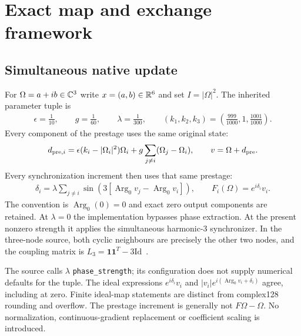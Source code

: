 \section{Exact map and exchange framework}\label{sec:model}
\subsection{Simultaneous native update}\label{sec:native}
For $\Omega=a+ib\in\mathbb C^3$ write $x=(a,b)\in\mathbb R^6$ and set $I=|\Omega|^2$. The inherited parameter tuple is~\cite[Section 6, native tuple]{rx}
\begin{equation}\label{eq:a01}%
\begin{gathered}
\epsilon=\frac1{10},\qquad g=\frac1{60},\qquad
\lambda=\frac1{300},\qquad
(k_1,k_2,k_3)=\left(\frac{999}{1000},1,\frac{1001}{1000}\right).
\end{gathered}
\end{equation}
Every component of the prestage uses the same original state:
\begin{equation}\label{eq:a02}%
\begin{gathered}
d_{{\rm pre},i}=\epsilon(k_i-|\Omega_i|^2)\Omega_i+
g\sum_{j\ne i}(\Omega_j-\Omega_i),\qquad v=\Omega+d_{\rm pre}.
\end{gathered}
\end{equation}
Every synchronization increment then uses that same prestage:
\begin{equation}\label{eq:a03}%
\begin{gathered}
\delta_i=\lambda\sum_{j\ne i}\sin(3[\operatorname{Arg}_0v_j-\operatorname{Arg}_0v_i]),
\qquad F_i(\Omega)=e^{i\delta_i}v_i.
\end{gathered}
\end{equation}
The convention is $\operatorname{Arg}_0(0)=0$ and exact zero output components are retained. At $\lambda=0$ the implementation bypasses phase extraction. At the present nonzero strength it applies the simultaneous harmonic-3 synchronizer. In the three-node source, both cyclic neighbours are precisely the other two nodes, and the coupling matrix is $L_3=\mathbf1\mathbf1^T-3\mathrm{Id}$~\cite{nativecode}.

The source calls $\lambda$ \texttt{phase\_strength}; its configuration does not supply numerical defaults for the tuple. The ideal expressions $e^{i\delta_i}v_i$ and $|v_i|e^{i(\operatorname{Arg}_0v_i+\delta_i)}$ agree, including at zero. Finite ideal-map statements are distinct from complex128 rounding and overflow. The prestage increment is generally not $F\Omega-\Omega$. No normalization, continuous-gradient replacement or coefficient scaling is introduced.

